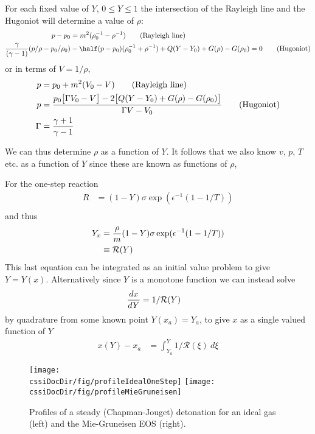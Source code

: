 \documentclass{article}
\newcommand{\cssiDocDir}{../cssi}
\begin{document}
\newcommand{\vf}{V} %

For each fixed value of $Y$, $0 \le Y \le 1$ the intersection of the Rayleigh line and the Hugoniot
will determine a value of $\rho$:
\begin{align*}
   p - p_0 &= m^2 ( \rho_0^{-1} - \rho^{-1} ) \qquad\mbox{(Rayleigh line)} \\
  {\gamma\over (\gamma-1)} (p/\rho - p_0/\rho_0 ) & -\half(p - p_0)( \rho_0^{-1} + \rho^{-1} ) 
           + Q(Y-Y_0) + G(\rho)-G(\rho_0) =0 \qquad\mbox{(Hugoniot)}
\end{align*}
or in terms of $\vf=1/\rho$, 
\begin{align*}
   p &= p_0 + m^2 ( \vf_0 - \vf ) \qquad\mbox{(Rayleigh line)} \\
   p &= { p_0 \big[ \Gamma \vf_0 - \vf \big] - 2\big[ Q(Y-Y_0) + G(\rho)-G(\rho_0) \big] \over
                 \Gamma\vf -\vf_0 }  \qquad\mbox{(Hugoniot)} \\
  \Gamma &= {\gamma+1 \over \gamma -1} 
\end{align*}

We can thus determine $\rho$ as a function of $Y$. It follows that we also know $v$, $p$, $T$ etc. as a function
of $Y$ since these are known as functions of $\rho$,

For the one-step reaction
\begin{align*}
   R &= (1-Y)\sigma \exp(\epsilon^{-1}(1-1/T)) \\
\end{align*}
and thus
\begin{align*}
  Y_x &= {\rho\over m} (1-Y)\sigma \exp(\epsilon^{-1}(1-1/T)) \\
      &\equiv {\mathcal R}(Y)
\end{align*}
This last equation can be integrated as an initial value problem 
to give $Y=Y(x)$. Alternatively since $Y$ is a monotone function 
we can instead solve
\begin{align*}
  {d x \over d Y} & = 1/{\mathcal R}(Y)
\end{align*}
by quadrature from some known point $Y(x_a)=Y_a$, to give $x$ as a single valued function
of $Y$
\begin{align*}
   x(Y) - x_a &= \int_{Y_a}^Y 1/{\mathcal R}(\xi) ~d\xi
\end{align*}

\begin{figure}[hbt]
 \begin{center}
   \texttt{[image: \\cssiDocDir/fig/profileIdealOneStep]}
   \texttt{[image: \\cssiDocDir/fig/profileMieGruneisen]}
 \end{center}
\caption{Profiles of a steady (Chapman-Jouget) detonation for an ideal gas (left) and
   the Mie-Gruneisen EOS (right). } \label{fig:detonationCJ}
\end{figure}
\end{document}
